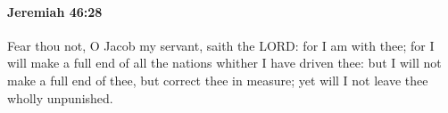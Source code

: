 
		\paragraph{Jeremiah 46:28} %
			\label{JEREMIAH-46-28}

			Fear thou not, O Jacob my servant, saith the LORD: for I am with thee; for I will make a full end of all the nations whither I have driven thee: but I will not make a full end of thee, but correct thee in measure; yet will I not leave thee wholly unpunished.

